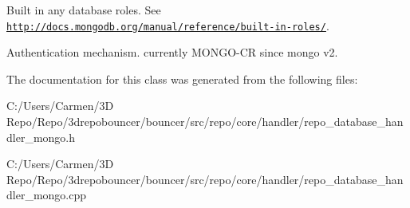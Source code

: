 Built in any database roles. See \href{http://docs.mongodb.org/manual/reference/built-in-roles/}{\tt http\+://docs.\+mongodb.\+org/manual/reference/built-\/in-\/roles/}. 

Authentication mechanism. currently M\+O\+N\+G\+O-\/\+C\+R since mongo v2. 

The documentation for this class was generated from the following files\+:\begin{DoxyCompactItemize}
\item 
C\+:/\+Users/\+Carmen/3\+D Repo/\+Repo/3drepobouncer/bouncer/src/repo/core/handler/repo\+\_\+database\+\_\+handler\+\_\+mongo.\+h\item 
C\+:/\+Users/\+Carmen/3\+D Repo/\+Repo/3drepobouncer/bouncer/src/repo/core/handler/repo\+\_\+database\+\_\+handler\+\_\+mongo.\+cpp\end{DoxyCompactItemize}
